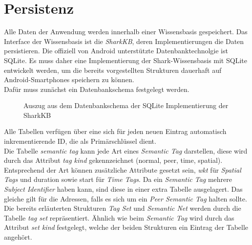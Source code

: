 \section{Persistenz}
Alle Daten der Anwendung werden innerhalb einer Wissensbasis gespeichert. Das Interface der Wissensbasis ist die \textit{SharkKB}, deren Implementierungen die Daten persistieren. Die offiziell von Android unterstützte Datenbanktechnolgie ist SQLite. Es muss daher eine Implementierung der Shark-Wissensbasis mit SQLite entwickelt werden, um die bereits vorgestellten Strukturen dauerhaft auf Android-Smartphones speichern zu können. 
\\Dafür muss zunächst ein Datenbankschema festgelegt werden. 
\begin{figure}[H]
	\centering
	\hspace*{1cm}
	\caption{Auszug aus dem Datenbankschema der SQLite Implementierung der SharkKB}
	\label{fig:sharkSQL}
\end{figure}
Alle Tabellen verfügen über eine sich für jeden neuen Eintrag automatisch inkrementierende ID, die als Primärschlüssel dient. \\Die Tabelle \textit{semantic tag} kann jede Art eines \textit{Semantic Tag} darstellen, diese wird durch das Attribut \textit{tag kind} gekennzeichnet (normal, peer, time, spatial). Entsprechend der Art können zusätzliche Attribute gesetzt sein, \textit{wkt} für \textit{Spatial Tags} und duration sowie start für \textit{Time Tags}. Da ein \textit{Semantic Tag} mehrere \textit{Subject Identifier} haben kann, sind diese in einer extra Tabelle ausgelagert. Das gleiche gilt für die Adressen, falls es sich um ein \textit{Peer Semantic Tag} halten sollte. 
\\Die bereits erläuterten Strukturen \textit{Tag Set} und \textit{Semantic Net} werden durch die Tabelle \textit{tag set} repräsentiert. Ähnlich wie beim \textit{Semantic Tag} wird durch das Attribut \textit{set kind} festgelegt, welche der beiden Strukturen ein Eintrag der Tabelle angehört. 

